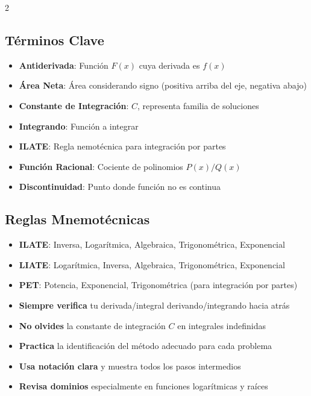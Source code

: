 \documentclass{article}
\newcommand{\highlight}[1]{\textbf{#1}}
\newcommand{\formula}[1]{\ensuremath{#1}}
\begin{document}
\begin{multicols}{2}
\subsection*{Términos Clave}
\begin{itemize}
    \item \highlight{Antiderivada}: Función \formula{F(x)} cuya derivada es \formula{f(x)}
    \item \highlight{Área Neta}: Área considerando signo (positiva arriba del eje, negativa abajo)
    \item \highlight{Constante de Integración}: \formula{C}, representa familia de soluciones
    \item \highlight{Integrando}: Función a integrar
    \item \highlight{ILATE}: Regla nemotécnica para integración por partes
    \item \highlight{Función Racional}: Cociente de polinomios \formula{P(x)/Q(x)}
    \item \highlight{Discontinuidad}: Punto donde función no es continua
\end{itemize}

\columnbreak

\subsection*{Reglas Mnemotécnicas}
\begin{itemize}
    \item \highlight{ILATE}: Inversa, Logarítmica, Algebraica, Trigonométrica, Exponencial
    \item \highlight{LIATE}: Logarítmica, Inversa, Algebraica, Trigonométrica, Exponencial
    \item \highlight{PET}: Potencia, Exponencial, Trigonométrica (para integración por partes)
\end{itemize}
\end{multicols}

\begin{tcolorbox}[
    enhanced,
    sharp corners,
    colback=gray!5!white,
    colframe=black,
    title=\textbf{Consejos Prácticos},
    fonttitle=\bfseries,
    drop shadow={black!30!white}
]
\begin{itemize}
    \item \textbf{Siempre verifica} tu derivada/integral derivando/integrando hacia atrás
    \item \textbf{No olvides} la constante de integración \formula{C} en integrales indefinidas
    \item \textbf{Practica} la identificación del método adecuado para cada problema
    \item \textbf{Usa notación clara} y muestra todos los pasos intermedios
    \item \textbf{Revisa dominios} especialmente en funciones logarítmicas y raíces
\end{itemize}
\end{tcolorbox}
\end{document}

